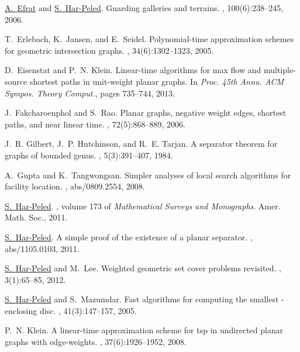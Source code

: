 \InSubmitVer{\documentclass[11pt]{article}}
\numberwithin{figure}{section}
\numberwithin{table}{section}
\numberwithin{equation}{section}
\begin{document}
\begin{thebibliography}{{Har}11b}
\href{http://www.cs.arizona.edu/~alon/}{A.~{Efrat}} and \href{http://www.uiuc.edu/~sariel}{S.~{{Har-Peled}}}.
\newblock Guarding galleries and terrains.
, 100(6):238--245, 2006.

T.~Erlebach, K.~Jansen, and E.~Seidel.
\newblock Polynomial-time approximation schemes for geometric intersection
  graphs.
, 34(6):1302--1323, 2005.

D.~Eisenstat and P.~N. Klein.
\newblock Linear-time algorithms for max flow and multiple-source shortest
  paths in unit-weight planar graphs.
\newblock In {\em Proc. 45th Annu. ACM Sympos. Theory Comput.\CNFSTOC}, pages
  735--744, 2013.

J.~Fakcharoenphol and S.~Rao.
\newblock Planar graphs, negative weight edges, shortest paths, and near linear
  time.
, 72(5):868--889, 2006.

J.~R. Gilbert, J.~P. Hutchinson, and R.~E. Tarjan.
\newblock A separator theorem for graphs of bounded genus.
, 5(3):391--407, 1984.

A.~Gupta and K.~Tangwongsan.
\newblock Simpler analyses of local search algorithms for facility location.
, abs/0809.2554, 2008.

\href{http://www.uiuc.edu/~sariel}{S.~{{Har-Peled}}}.
, volume 173 of {\em
  Mathematical Surveys and Monographs}.
\newblock Amer. Math. Soc., 2011.

\href{http://www.uiuc.edu/~sariel}{S.~{{Har-Peled}}}.
\newblock A simple proof of the existence of a planar separator.
, abs/1105.0103, 2011.

\href{http://www.uiuc.edu/~sariel}{S.~{{Har-Peled}}} and M.~Lee.
\newblock Weighted geometric set cover problems revisited.
, 3(1):65--85, 2012.

\href{http://www.uiuc.edu/~sariel}{S.~{{Har-Peled}}} and S.~{Mazumdar}.
\newblock Fast algorithms for computing the smallest -enclosing disc.
, 41(3):147--157, 2005.

P.~N. Klein.
\newblock A linear-time approximation scheme for tsp in undirected planar
  graphs with edge-weights.
, 37(6):1926--1952, 2008.


\end{thebibliography}
\end{document}
